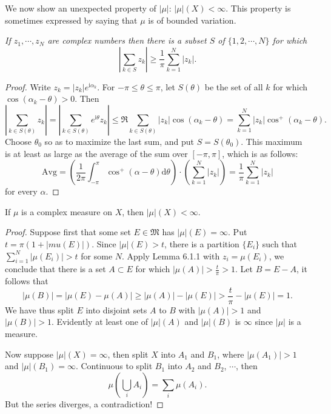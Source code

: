 We now show an unexpected property of $|\mu|$: $|\mu|(X)<\infty$. This property is sometimes expressed by saying that $\mu$ is of bounded variation.
\begin{lemma}\em
If $z_1,\cdots,z_N$ are complex numbers then there is a subset $S$ of $\{1,2,\cdots,N\}$ for which 
$$
\left| \sum_{k\in S}{z_k} \right|\ge \frac{1}{\pi}\sum_{k=1}^N{\left| z_k \right|}.
$$
\end{lemma}
\begin{proof}
Write $z_k=|z_k|e^{\mathrm{i}\alpha_k}$. For $-\pi\le\theta\le\pi$, let $S(\theta)$ be the set of all $k$ for which $\cos(\alpha_k-\theta)>0$. Then 
$$
\left| \sum_{k\in S\left( \theta \right)}{z_k} \right|=\left| \sum_{k\in S\left( \theta \right)}{e^{\mathrm{i}\theta}z_k} \right|\le \Re \sum_{k\in S\left( \theta \right)}{\left| z_k \right|\cos \left( \alpha _k-\theta \right)}=\sum_{k=1}^N{\left| z_k \right|\cos ^+\left( \alpha _k-\theta \right)}.
$$
Choose $\theta_0$ so as to maximize the last sum, and put $S=S(\theta_0)$. This maximum is at least as large as the average of the sum over $[-\pi,\pi]$, which is as follows: 
$$
\mathrm{Avg}=\left( \frac{1}{2\pi}\int_{-\pi}^{\pi}{\cos ^+\left( \alpha -\theta \right) \mathrm{d}\theta} \right) \cdot \left( \sum_{k=1}^N{\left| z_k \right|} \right) =\frac{1}{\pi}\sum_{k=1}^N{\left| z_k \right|}
$$
for every $\alpha$.
\end{proof}
\begin{theorem}
If $\mu$ is a complex measure on $X$, then $|\mu|(X)<\infty$.
\end{theorem}
\begin{proof}
Suppose first that some set $E\in\mathfrak{M}$ has $|\mu|(E)=\infty$. Put $t=\pi(1+|mu(E)|)$. Since $|\mu|(E)>t$, there is a partition $\{E_i\}$ such that $\sum_{i=1}^N|\mu(E_i)|>t$ for some $N$. Apply Lemma 6.1.1 with $z_i=\mu(E_i)$, we conclude that there is a set $A\subset E$ for which $|\mu(A)|>\frac{t}{\pi}>1$. Let $B=E-A$, it follows that 
$$
\left| \mu \left( B \right) \right|=\left| \mu \left( E \right) -\mu \left( A \right) \right|\ge \left| \mu \left( A \right) \right|-\left| \mu \left( E \right) \right|>\frac{t}{\pi}-\left| \mu \left( E \right) \right|=1.
$$
We have thus split $E$ into disjoint sets $A$ to $B$ with $|\mu(A)|>1$ and $|\mu(B)|>1$. Evidently at least one of $|\mu|(A)$ and $|\mu|(B)$ is $\infty$ since $|\mu|$ is a measure.\par
Now suppose $|\mu|(X)=\infty$, then split $X$ into $A_1$ and $B_1$, where $|\mu(A_1)|>1$ and $|\mu|(B_1)=\infty$. Continuous to split $B_1$ into $A_2$ and $B_2$, $\cdots$, then 
$$
\mu \left( \bigcup_i{A_i} \right) =\sum_i{\mu \left( A_i \right)}.
$$
But the series diverges, a contradiction!
\end{proof}
